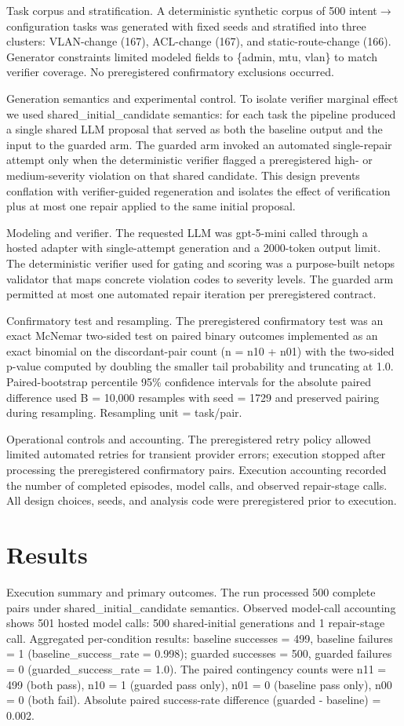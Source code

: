 \documentclass[conference]{IEEEtran}
\begin{document}
Task corpus and stratification. A deterministic synthetic corpus of 500 intent\ensuremath{\rightarrow}configuration tasks was generated with fixed seeds and stratified into three clusters: VLAN-change (167), ACL-change (167), and static-route-change (166). Generator constraints limited modeled fields to \{admin, mtu, vlan\} to match verifier coverage. No preregistered confirmatory exclusions occurred.

Generation semantics and experimental control. To isolate verifier marginal effect we used shared\_initial\_candidate semantics: for each task the pipeline produced a single shared LLM proposal that served as both the baseline output and the input to the guarded arm. The guarded arm invoked an automated single-repair attempt only when the deterministic verifier flagged a preregistered high- or medium-severity violation on that shared candidate. This design prevents conflation with verifier-guided regeneration and isolates the effect of verification plus at most one repair applied to the same initial proposal.

Modeling and verifier. The requested LLM was gpt-5-mini called through a hosted adapter with single-attempt generation and a 2000-token output limit. The deterministic verifier used for gating and scoring was a purpose-built netops validator that maps concrete violation codes to severity levels. The guarded arm permitted at most one automated repair iteration per preregistered contract.

Confirmatory test and resampling. The preregistered confirmatory test was an exact McNemar two-sided test on paired binary outcomes implemented as an exact binomial on the discordant-pair count (n = n10 + n01) with the two-sided p-value computed by doubling the smaller tail probability and truncating at 1.0. Paired-bootstrap percentile 95\% confidence intervals for the absolute paired difference used B = 10,000 resamples with seed = 1729 and preserved pairing during resampling. Resampling unit = task/pair.

Operational controls and accounting. The preregistered retry policy allowed limited automated retries for transient provider errors; execution stopped after processing the preregistered confirmatory pairs. Execution accounting recorded the number of completed episodes, model calls, and observed repair-stage calls. All design choices, seeds, and analysis code were preregistered prior to execution.

\section{Results}
Execution summary and primary outcomes. The run processed 500 complete pairs under shared\_initial\_candidate semantics. Observed model-call accounting shows 501 hosted model calls: 500 shared-initial generations and 1 repair-stage call. Aggregated per-condition results: baseline successes = 499, baseline failures = 1 (baseline\_success\_rate = 0.998); guarded successes = 500, guarded failures = 0 (guarded\_success\_rate = 1.0). The paired contingency counts were n11 = 499 (both pass), n10 = 1 (guarded pass only), n01 = 0 (baseline pass only), n00 = 0 (both fail). Absolute paired success-rate difference (guarded - baseline) = 0.002.
\end{document}
